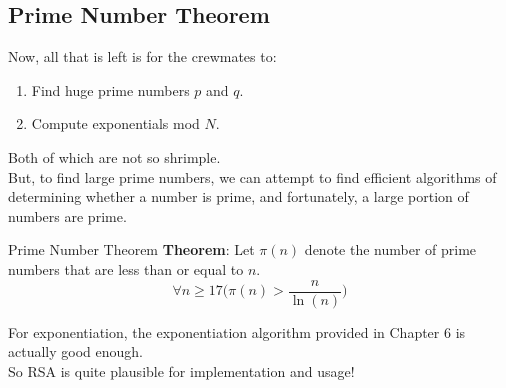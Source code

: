 \subsection{Prime Number Theorem}
Now, all that is left is for the crewmates to:
\begin{enumerate}
    \item Find huge prime numbers $p$ and $q$.
    \item Compute exponentials mod $N$.
\end{enumerate}
Both of which are not so shrimple. \\
But, to find large prime numbers, we can attempt to find efficient algorithms of determining whether a number is prime, and fortunately, a large portion of numbers are prime. \\
\begin{ln-theorem}{Prime Number Theorem}{}
    \textbf{Theorem}: Let $\pi (n)$ denote the number of prime numbers that are less than or equal to $n$. \\
    \[\forall n \geq 17 \bigg( \pi (n) > \frac{n}{\ln(n)} \bigg)\]
\end{ln-theorem}
For exponentiation, the exponentiation algorithm provided in Chapter 6 is actually good enough. \\
So RSA is quite plausible for implementation and usage!

